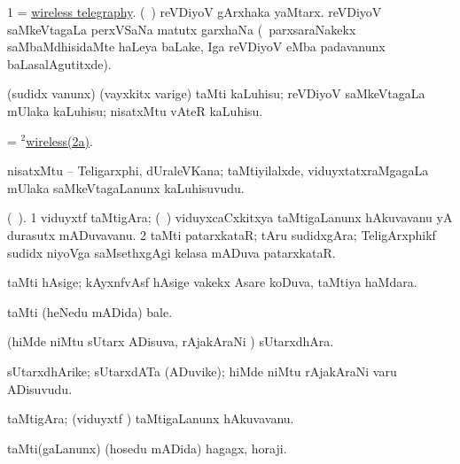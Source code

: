 \bentry
{} 
\gl{\nA}
\bmng
\bnum
\num{1} = \hyperlink{wireless telegraphy}{wireless telegraphy}. 
 (\kanmu\ \birx) 
\hypertarget{wireless(2)2a}{} 
\banum
{} reVDiyoV gArxhaka yaMtarx. 
 reVDiyoV saMkeVtagaLa perxVSaNa matutx garxhaNa (\kanmu\ parxsaraNakekx saMbaMdhisidaMte haLeya baLake, Iga reVDiyoV eMba padavanunx baLasalAgutitxde). 
\eanum
\numie
\enum
\emng
\eentry

\bentry
{} 
\gl{\akirx}
\bmng
(sudidx \mo vanunx) (vayxkitx \mo varige) taMti kaLuhisu; reVDiyoV saMkeVtagaLa mUlaka kaLuhisu; nisatxMtu vAteR kaLuhisu. 
\emng
\eentry

\bentry
{}
\gl{\nA}
\bmng
= \hyperlink{wireless(2)2a}{$^2$wireless(2a)}. 
\emng
\eentry

\bentry
{}
\gl{\nA}
\bmng
nisatxMtu -- Teligarxphi, dUraleVKana; taMtiyilalxde, viduyxtatxraMgagaLa mUlaka saMkeVtagaLanunx kaLuhisuvudu. 
\emng
\eentry

\bentry
{}
\gl{\nA} (\bava\ ).
\bmng
\bnum
\num{1} viduyxtf taMtigAra; (\kanmu\ \ame) viduyxcaCxkitxya taMtigaLanunx hAkuvavanu yA durasutx mADuvavanu. 
\num{2} taMti patarxkataR; tAru sudidxgAra; TeligArxphikf sudidx niyoVga saMsethxgAgi kelasa mADuva patarxkataR. 
\enum
\emng
\eentry

\bentry
{}
\gl{\nA}
\bmng
taMti hAsige; kAyxnfvAsf hAsige \mo vakekx Asare koDuva, taMtiya haMdara. 
\emng
\eentry

\bentry
{}
\gl{\nA}
\bmng
taMti (heNedu mADida) bale. 
\emng
\eentry

\bentry
{}
\gl{\nA}
\bmng
(hiMde niMtu sUtarx ADisuva, rAjakAraNi \mo) sUtarxdhAra. 
\emng
\eentry

\bentry
{}
\gl{\nA}
\bmng
sUtarxdhArike; sUtarxdATa (ADuvike); hiMde niMtu rAjakAraNi \mo varu ADisuvudu. 
\emng
\eentry

\bentry
{}
\gl{\nA}
\bmng
taMtigAra; (viduyxtf \mo) taMtigaLanunx hAkuvavanu. 
\emng
\eentry

\bentry
{}
\gl{\nA}
\bmng
taMti(gaLanunx) (hosedu mADida) hagagx, horaji. 
\emng
\eentry

